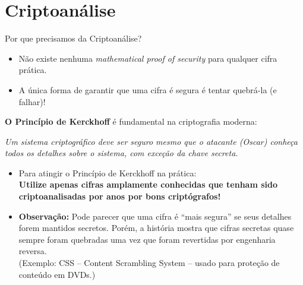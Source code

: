 \documentclass{beamer}
\begin{document}
\section{Criptoanálise}
\begin{frame}{Por que precisamos da Criptoanálise?}
\vspace{-0.5em}
\begin{itemize}
    \item Não existe nenhuma \textit{mathematical proof of security} para qualquer cifra prática.
    \item A única forma de garantir que uma cifra é segura é tentar quebrá-la (e falhar)!
\end{itemize}

\textbf{O Princípio de Kerckhoff} é fundamental na criptografia moderna:

\begin{block}{}
\centering
\textit{Um sistema criptográfico deve ser seguro mesmo que o atacante (Oscar) conheça todos os detalhes sobre o sistema, com exceção da chave secreta.}
\end{block}

\begin{itemize}
    \item Para atingir o Princípio de Kerckhoff na prática: \\
    \textbf{Utilize apenas cifras amplamente conhecidas que tenham sido criptoanalisadas por anos por bons criptógrafos!} \\

    \item \textbf{Observação:} Pode parecer que uma cifra é “mais segura” se seus detalhes forem mantidos secretos. Porém, a história mostra que cifras secretas quase sempre foram quebradas uma vez que foram revertidas por engenharia reversa. \\
    (Exemplo: CSS – Content Scrambling System – usado para proteção de conteúdo em DVDs.)
\end{itemize}
\end{frame}
\end{document}
